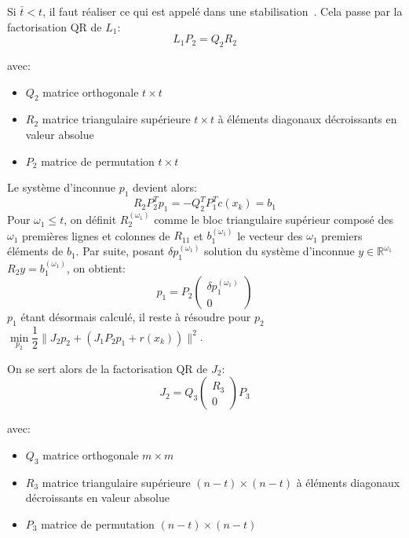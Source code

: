 \documentclass[a4paper,11pt]{article}
\newcommand{\real}{\mathbb{R}}
\numberwithin{equation}{section}
\newif\ifnotes\notestrue
\def\boxnote#1#2{\ifnotes\fbox{\footnote{\ }}\ \footnotetext{ From #1: #2}\fi}
\def\fabian#1{\boxnote{Fabian}{\color{blue}#1}}
\begin{document}
Si $\bar{t}<t$, il faut réaliser ce qui est appelé dans \cite{lindstromwedin1988} une stabilisation\fabian{Pourquoi?}. Cela passe par la factorisation QR de $L_{1}$: 
\begin{equation} \label{qrL}
L_{1}P_2 = Q_{2} R_{2}
\end{equation}

avec:
\begin{itemize}
\item
$Q_2$ matrice orthogonale $t \times t$
\item
$R_{2}$ matrice triangulaire supérieure $t \times t$ à éléments diagonaux décroissants en valeur absolue 
\item
$P_2$ matrice de permutation $t \times t$
\end{itemize}

Le système d'inconnue $p_{1}$ devient alors:
$$ R_{2}P_2^Tp_1 = -Q_2^TP_1^Tc(x_{k}) = b_{1} $$ 
Pour $\omega_{1} \leq t$, on définit $R_{2}^{(\omega_{1})}$ comme le bloc triangulaire supérieur composé des $\omega_{1}$ premières lignes et colonnes de $R_{11}$ et $b_{1}^{(\omega_{1})}$ le vecteur des $\omega_{1}$ premiers éléments de $b_{1}$. Par suite, posant $\delta p_1^{(\omega_{1})}$ solution du système d'inconnue $y \in \real^{\omega_{1}}$  $R_{2}y=b_{1}^{(\omega_{1})}$, on obtient:
\begin{equation}
p_1 = P_2\begin{pmatrix} \delta p_1^{(\omega_{1})} \\ 0 \end{pmatrix}
\end{equation}
$p_1$ étant désormais calculé, il reste à résoudre pour $p_2$ $\underset{p_2}{\min} \dfrac{1}{2}\|J_2p_2 + (J_1P_{2}p_1 + r(x_{k}))\|^2$. 


On se sert alors de la factorisation QR de $J_{2}$:
\begin{equation} \label{qrJ2}
J_{2} = Q_3\begin{pmatrix} R_{3} \\ 0\end{pmatrix}P_3
\end{equation}

avec:
\begin{itemize}
\item
$Q_3$ matrice orthogonale $m \times m$
\item
$R_{3}$ matrice triangulaire supérieure $(n-t) \times (n-t)$ à éléments diagonaux décroissants en valeur absolue 
\item
$P_3$ matrice de permutation $(n-t) \times (n-t)$
\end{itemize}
\end{document}
